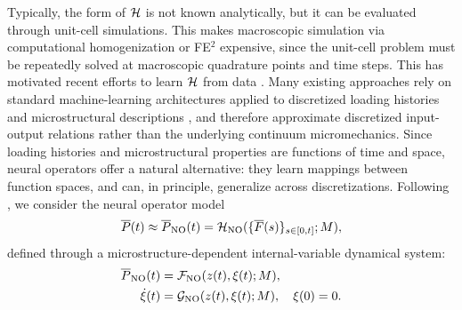 \documentclass[3p, 12pt, preprint]{elsarticle}
\begin{document}
Typically, the form of ${\mathcal{H}}$ is not known analytically, but it can be evaluated through unit-cell simulations. This makes macroscopic simulation via computational homogenization or FE$^2$ \cite{feyel2000fe2,miehe1999computational,geers2010multiscale} expensive, since the unit-cell problem must be repeatedly solved at macroscopic quadrature points and time steps. This has motivated recent efforts to learn ${\mathcal{H}}$ from data \cite{ghavamian2019accelerating,logarzo2021smart,liu2022learning,liu2023learning,bhattacharya2023learning, karimi2024learning, raj2026neural}. Many existing approaches rely on standard machine-learning architectures applied to discretized loading histories and microstructural descriptions \cite{ghavamian2019accelerating,mozaffar2019deep,liu2019a,gorji2020on,rao2020threedimensional}, and therefore approximate discretized input-output relations rather than the underlying continuum micromechanics. Since loading histories and microstructural properties are functions of time and space, neural operators \cite{liu2022learning, kovachki2023neural, liu2023learning, bhattacharya2024learning, bhattacharya2026multiscale} offer a natural alternative: they learn mappings between function spaces,  and can, in principle, generalize across discretizations. Following \cite{liu2023learning, bhattacharya2025learning}, we consider the neural operator model
\begin{equation*}
    \overline{P}(t)\approx \overline{P}_{\mathrm{NO}}(t) = {\mathcal{H}}_{\mathrm{NO}}(\{\overline{F}(s)\}_{s\in[0,t]}; M),
\end{equation*}
defined through a microstructure-dependent internal-variable dynamical system:
\begin{subequations}
\label{eq:two}
\begin{align}
    \overline{P}_{\mathrm{NO}}(t) &= {\mathcal{F}}_{\mathrm{NO}}(z(t), \xi(t); M),\\
    \dot{\xi}(t) &= {\mathcal{G}}_{\mathrm{NO}}(z(t),\xi(t); M),\quad \xi(0)=0.
\end{align}
\end{subequations}
\end{document}
